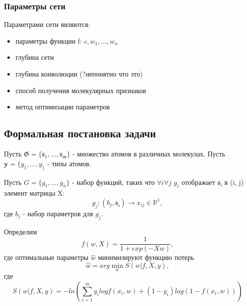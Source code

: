 \documentclass[12pt,twoside]{article}
\begin{document}
\subsubsection{Параметры сети}
Параметрами сети являются:
\begin{itemize}
\item параметры функции f: $c, w_1,\dots,w_n$
\item глубина сети
\item глубина конволюции (?непонятно что это)
\item способ получения молекулярных признаков
\item метод оптимизации параметров
\end{itemize}
\subsection{Формальная постановка задачи}
	Пусть  $\mathfrak{G} = \{\mathfrak{s_1},...,\mathfrak{s_m}\}$ - множество атомов в различных молекулах. Пусть $\textbf{y} = \{y_1,...,y_\}$ - типы атомов.

	Пусть $G = \{g_1,...,g_n\}$ - набор функций, таких что $\forall i \forall j$ $g_j$ отображает $\mathfrak{s_i}$ в (i, j) элемент матрицы X: $$g_j: (b_j, \mathfrak{s_i})\rightarrow x_{ij} \in \mathbb{R}^1,$$ где $b_j$ - набор параметров для $g_j$.
	
	Определим $$f(w, X) = \frac{1}{1+exp(-Xw)},$$ где оптимальные параметры $\hat{w}$ минимизируют функцию потерь $$\hat{w}=arg\min\limits_{w} S(w|f, X, y),$$ где $$S(w|f, X, y)=-ln(\sum_{i=1}^m {y_i logf(x_i, w) + (1-y_i)log(1-f(x_i, w))})$$
\end{document}
